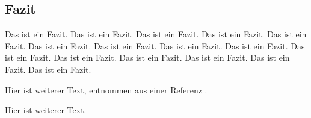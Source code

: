 \subsection{Fazit}
Das ist ein Fazit. Das ist ein Fazit. Das ist ein Fazit. Das ist ein Fazit. Das ist ein Fazit. Das ist ein Fazit. Das ist ein Fazit. Das ist ein Fazit. Das ist ein Fazit. Das ist ein Fazit. Das ist ein Fazit. Das ist ein Fazit. Das ist ein Fazit. Das ist ein Fazit. Das ist ein Fazit.


Hier ist weiterer Text, entnommen aus einer Referenz \cite{000:Reference}.

\begin{comment}
\begin{codebox}{python}{Code}
	print('Hello World')
\end{codebox}
\end{comment}

Hier ist weiterer Text.
